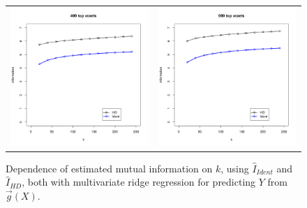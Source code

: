 \begin{figure}
\begin{tabular}{cc}
\includegraphics[scale = 0.4]{../../Yuval/ident_infer4_edited.png} &
\includegraphics[scale = 0.4]{../../Yuval/ident_infer5_edited.png}
\end{tabular}
\caption{Dependence of estimated mutual information on $k$, using $\hat{I}_{Ident}$ and $\hat{I}_{HD}$, both with multivariate ridge regression for predicting $Y$ from $\vec{g}(X)$.}
\label{fig:dependence_k}
\end{figure}


